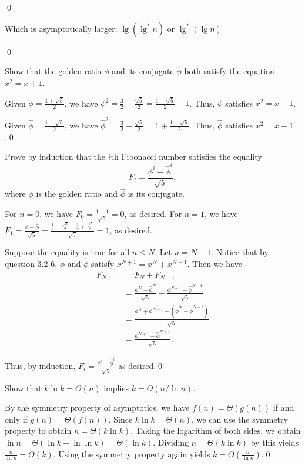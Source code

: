 \sol \qed

 Which is asymptotically larger: $\lg(\lg ^* n)$ or $\lg ^* (\lg n)$

\sol \qed

 Show that the golden ratio $\phi$ and its conjugate $\hat{\phi}$ both satisfy the equation $x^2 = x + 1$.

\sol Given $\phi = \frac{1 + \sqrt{5}}{2}$, we have $\phi^2 = \frac{3}{2} + \frac{\sqrt{5}}{2} = \frac{1 + \sqrt{5}}{2} + 1$. Thus, $\phi$ satisfies $x^2 = x + 1$.

Given $\hat\phi = \frac{1 - \sqrt{5}}{2}$, we have $\hat\phi^2 = \frac{3}{2} - \frac{\sqrt{5}}{2} = 1 + \frac{1 - \sqrt{5}}{2}$. Thus, $\hat\phi$ satisfies $x^2 = x + 1$.\qed

 Prove by induction that the $i$th Fibonacci number satisfies the equality $$F_i = \frac{\phi^i - \hat{\phi}^i}{\sqrt{5}},$$ where $\phi$ is the golden ratio and $\hat{\phi}$ is its conjugate.

\pf For $n = 0$, we have $F_0 = \frac{1 - 1}{\sqrt{5}} = 0$, as desired. For $n = 1$, we have $F_1 = \frac{\phi - \hat\phi}{\sqrt{5}} = \frac{\frac{1}{2} + \frac{\sqrt{5}}{2} - \frac{1}{2} + \frac{\sqrt{5}}{2}}{\sqrt{5}} = 1$, as desired.

Suppose the equality is true for all $n \leq N$. Let $n = N+1$. Notice that by question 3.2-6, $\phi$ and $\hat \phi$ satisfy $x^{N+1} = x^N + x^{N-1}$. Then we have
\begin{align*}
    F_{N+1} &= F_N + F_{N-1} \\
    &= \frac{\phi^N - \hat\phi^N}{\sqrt{5}} + \frac{\phi^{N-1} - \hat\phi^{N-1}}{\sqrt{5}} \\
    &= \frac{\phi^N + \phi^{N-1} - (\hat\phi^N + \hat\phi^{N-1})}{\sqrt{5}} \\
    &= \frac{\phi^{N+1} - \hat\phi^{N+1}}{\sqrt{5}}.
\end{align*}

Thus, by induction, $F_i = \frac{\phi^i - \hat\phi^i}{\sqrt{5}}$ as desired.\qed

 Show that $k \ln k = \Theta(n)$ implies $k = \Theta(n / \ln n)$.

\sol By the symmetry property of asymptotics, we have $f(n) = \Theta(g(n))$ if and only if $g(n) = \Theta(f(n))$. Since $k \ln k = \Theta(n)$, we can use the symmetry property to obtain $n = \Theta(k \ln k)$. Taking the logarithm of both sides, we obtain $\ln n = \Theta(\ln k + \ln \ln k) = \Theta(\ln k)$. Dividing $n = \Theta(k \ln k)$ by this yields $\frac{n}{\ln n} = \Theta(k)$. Using the symmetry property again yields $k = \Theta(\frac{n}{\ln n})$.\qed

